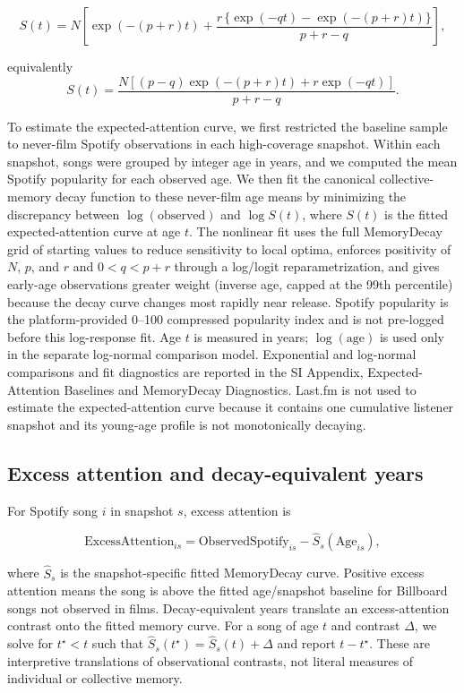 \documentclass[10pt]{article}
\begin{document}
\begin{equation}
S(t)=N\left[\exp(-(p+r)t)+\frac{r\,\{\exp(-qt)-\exp(-(p+r)t)\}}{p+r-q}\right],
\end{equation}

equivalently
\begin{equation}
S(t)=\frac{N[(p-q)\exp(-(p+r)t)+r\exp(-qt)]}{p+r-q}.
\end{equation}

To estimate the expected-attention curve, we first restricted the baseline sample to never-film Spotify observations in each high-coverage snapshot. Within each snapshot, songs were grouped by integer age in years, and we computed the mean Spotify popularity for each observed age. We then fit the canonical collective-memory decay function to these never-film age means by minimizing the discrepancy between $\log(\mathrm{observed})$ and $\log S(t)$, where $S(t)$ is the fitted expected-attention curve at age $t$. The nonlinear fit uses the full MemoryDecay grid of starting values to reduce sensitivity to local optima, enforces positivity of $N$, $p$, and $r$ and $0<q<p+r$ through a log/logit reparametrization, and gives early-age observations greater weight (inverse age, capped at the 99th percentile) because the decay curve changes most rapidly near release. Spotify popularity is the platform-provided 0--100 compressed popularity index and is not pre-logged before this log-response fit. Age $t$ is measured in years; $\log(\mathrm{age})$ is used only in the separate log-normal comparison model. Exponential and log-normal comparisons and fit diagnostics are reported in the SI Appendix, Expected-Attention Baselines and MemoryDecay Diagnostics. Last.fm is not used to estimate the expected-attention curve because it contains one cumulative listener snapshot and its young-age profile is not monotonically decaying.

\subsection*{Excess attention and decay-equivalent years}

For Spotify song $i$ in snapshot $s$, excess attention is

\begin{equation}
\mathrm{ExcessAttention}_{is}=\mathrm{ObservedSpotify}_{is}-\widehat{S}_s(\mathrm{Age}_{is}),
\end{equation}

where $\widehat{S}_s$ is the snapshot-specific fitted MemoryDecay curve. Positive excess attention means the song is above the fitted age/snapshot baseline for Billboard songs not observed in films. Decay-equivalent years translate an excess-attention contrast onto the fitted memory curve. For a song of age $t$ and contrast $\Delta$, we solve for $t^\star<t$ such that $\widehat{S}_s(t^\star)=\widehat{S}_s(t)+\Delta$ and report $t-t^\star$. These are interpretive translations of observational contrasts, not literal measures of individual or collective memory.
\end{document}
